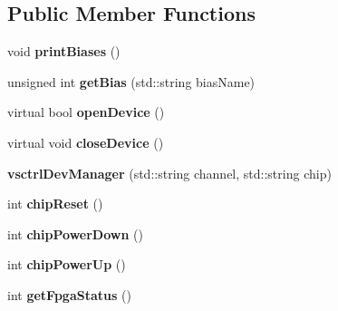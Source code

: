 \subsection*{Public Member Functions}
\begin{DoxyCompactItemize}
\item 
\hypertarget{classvsctrlDevManager_a089d585fca4be21726d0708977abc7e4}{void {\bfseries print\-Biases} ()}\label{classvsctrlDevManager_a089d585fca4be21726d0708977abc7e4}

\item 
\hypertarget{classvsctrlDevManager_a4942068d2a90273bf333b9c5bd4bca1c}{unsigned int {\bfseries get\-Bias} (std\-::string bias\-Name)}\label{classvsctrlDevManager_a4942068d2a90273bf333b9c5bd4bca1c}

\item 
\hypertarget{classvsctrlDevManager_aee610b6b7e574e4763b15e1993e9ef4b}{virtual bool {\bfseries open\-Device} ()}\label{classvsctrlDevManager_aee610b6b7e574e4763b15e1993e9ef4b}

\item 
\hypertarget{classvsctrlDevManager_a5ca1d208ff16147546fd918af0a18cda}{virtual void {\bfseries close\-Device} ()}\label{classvsctrlDevManager_a5ca1d208ff16147546fd918af0a18cda}

\item 
\hypertarget{classvsctrlDevManager_ab54ace30b1bd3398fc951e82745f38aa}{{\bfseries vsctrl\-Dev\-Manager} (std\-::string channel, std\-::string chip)}\label{classvsctrlDevManager_ab54ace30b1bd3398fc951e82745f38aa}

\item 
\hypertarget{classvsctrlDevManager_a9db8592ea35fc47134c0a7d3e261462d}{int {\bfseries chip\-Reset} ()}\label{classvsctrlDevManager_a9db8592ea35fc47134c0a7d3e261462d}

\item 
\hypertarget{classvsctrlDevManager_aaffe2de0b0b855eaf69aa8d26ca8adfb}{int {\bfseries chip\-Power\-Down} ()}\label{classvsctrlDevManager_aaffe2de0b0b855eaf69aa8d26ca8adfb}

\item 
\hypertarget{classvsctrlDevManager_a26ee4e76e8691abcf9bf01fb1943aa5e}{int {\bfseries chip\-Power\-Up} ()}\label{classvsctrlDevManager_a26ee4e76e8691abcf9bf01fb1943aa5e}

\item 
\hypertarget{classvsctrlDevManager_aa9d0e1ebe2852643821a903769c72a88}{int {\bfseries get\-Fpga\-Status} ()}\label{classvsctrlDevManager_aa9d0e1ebe2852643821a903769c72a88}


\end{DoxyCompactItemize}

